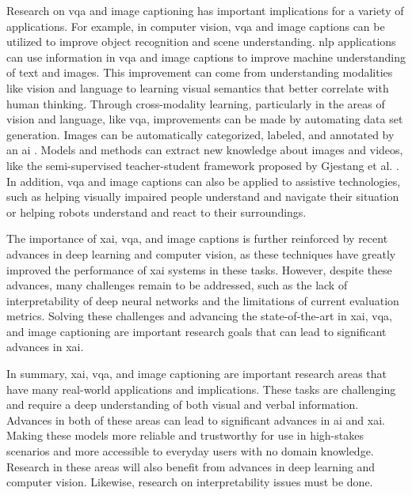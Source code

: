 Research on \gls{vqa} and image captioning has important implications for a variety of applications. For example, in computer vision, \gls{vqa} and image captions can be utilized to improve object recognition and scene understanding. \gls{nlp} applications can use information in \gls{vqa} and image captions to improve machine understanding of text and images. This improvement can come from understanding modalities like vision and language to learning visual semantics that better correlate with human thinking. Through cross-modality learning, particularly in the areas of vision and language, like \gls{vqa}, improvements can be made by automating data set generation. Images can be automatically categorized, labeled, and annotated by an \gls{ai} \cite{lancasterAutomatedLabelingHuman1997, mnihMachineLearningAerial}. Models and methods can extract new knowledge about images and videos, like the semi-supervised teacher-student framework proposed by Gjestang et al. \cite{gjestangSelflearningTeacherstudentFramework2021}.
In addition, \gls{vqa} and image captions can also be applied to assistive technologies, such as helping visually impaired people understand and navigate their situation or helping robots understand and react to their surroundings.

The importance of \gls{xai}, \gls{vqa}, and image captions is further reinforced by recent advances in deep learning and computer vision, as these techniques have greatly improved the performance of \gls{xai} systems in these tasks. 
However, despite these advances, many challenges remain to be addressed, such as the lack of interpretability of deep neural networks and the limitations of current evaluation metrics. Solving these challenges and advancing the state-of-the-art in \gls{xai}, \gls{vqa}, and image captioning are important research goals that can lead to significant advances in \gls{xai}.

In summary, \gls{xai}, \gls{vqa}, and image captioning are important research areas that have many real-world applications and implications. 
These tasks are challenging and require a deep understanding of both visual and verbal information. Advances in both of these areas can lead to significant advances in \gls{ai} and \gls{xai}. Making these models more reliable and trustworthy for use in high-stakes scenarios and more accessible to everyday users with no domain knowledge. 
Research in these areas will also benefit from advances in deep learning and computer vision. Likewise, research on interpretability issues must be done.
